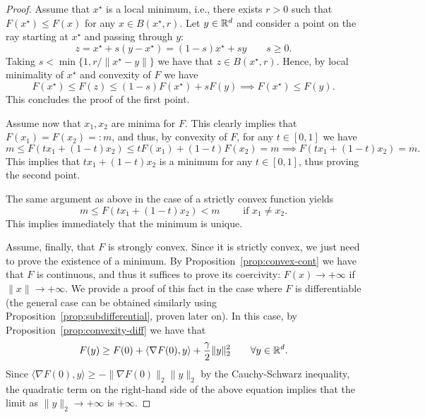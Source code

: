  \begin{proof}
     Assume that $x^\star$ is a local minimum, i.e., there exists $r>0$ such that $F(x^\star)\le F(x)$ for any $x\in B(x^\star,r)$.
     Let $y\in \mathbb{R}^d$ and consider a point on the ray starting at $x^\star$ and passing through $y$:
     \begin{equation}
         z = x^\star + s (y-x^\star) =   (1-s)x^\star + s y\qquad s\ge 0.
     \end{equation}
     Taking $s < \min\{1, r/\|x^\star - y\|\}$ we have that $z\in B(x^\star,r)$. Hence, by local minimality of $x^\star$ and convexity of $F$ we have
     \begin{equation}
         F(x^\star) \le F(z) \le (1-s)F(x^\star) + s F(y) \implies F(x^\star) \le F(y).
     \end{equation}
     This concludes the proof of the first point.
 
     Assume now that $x_1,x_2$ are minima for $F$. This clearly implies that $F(x_1)=F(x_2) =: m$, and thus, by convexity of $F$, for any $t\in [0,1]$ we have
     \begin{equation}
         m \le F(t x_1 + (1-t)x_2) \le t F(x_1) +(1-t) F(x_2) = m \implies F(t x_1 + (1-t)x_2)=m.
     \end{equation}
     This implies that $t x_1 + (1-t)x_2$ is a minimum for any $t\in [0,1]$, thus proving the second point.
 
     The same argument as above in the case of a strictly convex function yields
     \begin{equation}
         m \le F(tx_1+(1-t)x_2) < m \qquad \text{ if } x_1\neq x_2.
     \end{equation}
     This implies immediately that the minimum is unique.
 
     Assume, finally, that $F$ is strongly convex. Since it is strictly convex, we just need to prove the existence of a minimum.
     By Proposition~\ref{prop:convex-cont} we have that $F$ is continuous, and thus it suffices to prove its coercivity: $F(x)\to +\infty$ if $\|x\|\to +\infty$.
     We provide a proof of this fact in the case where $F$ is differentiable (the general case can be obtained similarly using Proposition~\ref{prop:subdifferential}, proven later on). In this case, by Proposition~\ref{prop:convexity-diff} we have that
     \begin{equation}
         F(y) \ge F(0)+\langle \nabla F(0),y\rangle +\frac\gamma2\|y\|_2^2 \qquad \forall y\in \mathbb{R}^d.
     \end{equation}
     Since $\langle \nabla F(0),y\rangle \ge -\|\nabla F(0)\|_2\|y\|_2$ by the Cauchy-Schwarz inequality, the quadratic term on the right-hand side of the above equation implies that the limit as $\|y\|_2\to +\infty$ is $+\infty$.
 \end{proof}
 
